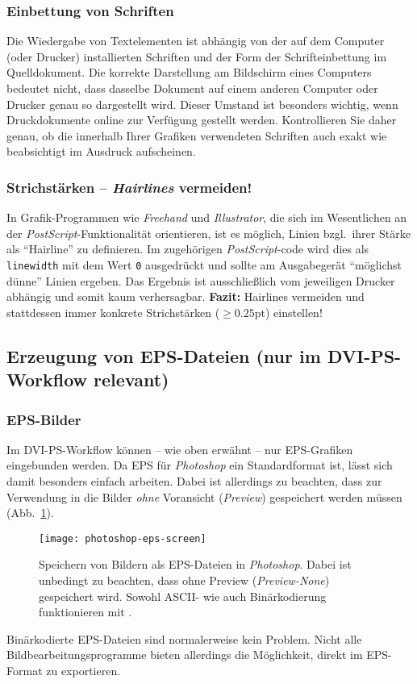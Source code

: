 \subsubsection{Einbettung von Schriften}

Die Wiedergabe von Textelementen ist abhängig von der auf dem
Computer (oder Drucker) installierten Schriften und der Form der
Schrifteinbettung im Quelldokument. Die korrekte Darstellung am
Bildschirm eines Computers bedeutet nicht, dass dasselbe Dokument
auf einem anderen Computer oder Drucker genau so dargestellt wird.
Dieser Umstand ist besonders wichtig, wenn Druckdokumente online
zur Verfügung gestellt werden. Kontrollieren Sie daher genau, ob
die innerhalb Ihrer Grafiken verwendeten Schriften auch exakt wie
beabsichtigt im Ausdruck aufscheinen.


\subsubsection{Strichstärken -- \emph{Hairlines} vermeiden!}

In Grafik-Programmen wie \emph{Freehand} und \emph{Illustrator},
die sich im Wesentlichen an der \emph{PostScript}-Funktionalität
orientieren, ist es möglich, Linien bzgl.\ ihrer Stärke als
"`Hairline"' zu definieren. Im zugehörigen \emph{PostScript}-code
wird dies als \texttt{linewidth} mit dem Wert \texttt{0} ausgedrückt und
sollte am Ausgabegerät "`möglichst dünne"' Linien ergeben. Das
Ergebnis ist ausschließlich vom jeweiligen Drucker
abhängig und somit kaum verhersagbar. 
\textbf{Fazit:} Hairlines vermeiden und stattdessen immer konkrete
Strichstärken ($\geq 0.25 \mathrm{pt}$) einstellen!


\subsection{Erzeugung von EPS-Dateien (nur im DVI-PS-Work\-flow relevant)}

\subsubsection{EPS-Bilder }

Im DVI-PS-Workflow können -- wie oben erwähnt -- nur
EPS-Grafi\-ken eingebunden werden. Da EPS für \emph{Photoshop} ein
Standardformat ist, lässt sich damit besonders einfach arbeiten.
Dabei ist allerdings zu beachten, dass zur Verwendung in \latex
die Bilder \emph{ohne} Voransicht (\emph{Preview}) gespeichert
werden müssen (Abb.~\ref{fig:photoshop-eps-screen}). 
%
\begin{figure}
\centering
\texttt{[image: photoshop-eps-screen]}
\caption{Speichern von Bildern als EPS-Dateien in \emph{Photoshop}.
Dabei ist unbedingt zu beachten, dass ohne Preview
(\emph{Preview-None}) gespeichert wird.
Sowohl ASCII- wie auch Binärkodierung funktionieren mit \latex.
}
\label{fig:photoshop-eps-screen}
\end{figure}
%
Binärkodierte
EPS-Dateien sind normalerweise kein Problem. Nicht alle
Bildbearbeitungsprogramme bieten allerdings die Möglichkeit,
direkt im EPS-Format zu exportieren.


